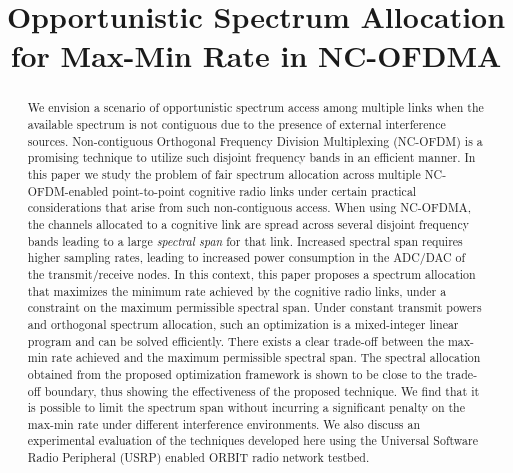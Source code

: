 \documentclass[conference]{IEEEtran}
\begin{document}
\title{Opportunistic Spectrum Allocation for Max-Min Rate in NC-OFDMA}


\author{ }
\IEEEoverridecommandlockouts
\maketitle

\begin{abstract}
We envision a scenario of opportunistic spectrum access among multiple links when the available spectrum is not contiguous due to the presence of external interference sources. Non-contiguous Orthogonal Frequency Division Multiplexing (NC-OFDM) is a promising technique to utilize such disjoint frequency bands in an efficient manner. In this paper we study the problem of fair spectrum allocation across multiple NC-OFDM-enabled point-to-point cognitive radio links under certain practical considerations that arise from such non-contiguous access. When using NC-OFDMA, the channels allocated to a cognitive link are spread across several disjoint frequency bands leading to a large \textit{spectral span} for that link. Increased spectral span requires higher sampling rates, leading to increased power consumption in the ADC/DAC of the transmit/receive nodes. 
In this context, this paper proposes a spectrum allocation that maximizes the minimum rate achieved by the cognitive radio links, under a constraint on the maximum permissible spectral span. Under constant transmit powers and orthogonal spectrum allocation, such an optimization is a mixed-integer linear program and can be solved efficiently. 
There exists a clear trade-off between the max-min rate achieved and the maximum permissible spectral span. The spectral allocation obtained from the proposed optimization framework is shown to be close to the trade-off boundary, thus showing the effectiveness of the proposed technique. We find that it is possible to limit the spectrum span without incurring a significant penalty on the max-min rate under different interference environments. We also discuss an experimental evaluation of the techniques developed here using the Universal Software Radio Peripheral (USRP) enabled ORBIT radio network testbed. 
\end{abstract}
\end{document}
